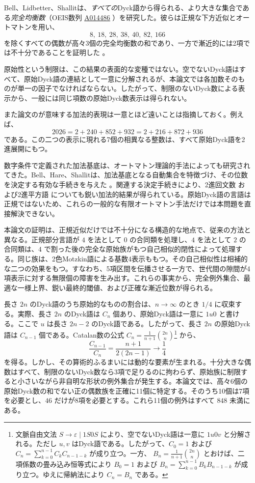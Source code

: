 \documentclass[12pt]{ltjsarticle}
\theoremstyle{plain}
\theoremstyle{definition}
\theoremstyle{plain}
\newcommand{\seqnum}[1]{\href{https://oeis.org/#1}{\textrm{\underline{#1}}}}
\begin{document}
Bell、Lidbetter、Shallitは、\emph{すべての}Dyck語から得られる、より大きな集合である\emph{完全均衡数}（OEIS数列 \seqnum{A014486} \cite{OEIS-A014486}）を研究した。彼らは正規な下方近似とオートマトンを用い、
\[
        8,\ 18,\ 28,\ 38,\ 40,\ 82,\ 166
\]
を除くすべての偶数が高々3個の完全均衡数の和であり、一方で漸近的には2項では不十分であることを証明した \cite[Thm.\ 14]{BLS}。

原始性という制限は、この結果の表面的な変種ではない。空でないDyck語はすべて、原始Dyck語の連結として一意に分解されるが、本論文では各加数そのものが単一の因子でなければならない。したがって、制限のないDyck数による表示から、一般には同じ項数の原始Dyck数表示は得られない。

また論文のが意味する加法的表現は一意とほど遠いことは指摘しておく。例えば、
\[
 2026=2+240+852+932=2+216+872+936
\]
である。この二つの表示に現れる7個の相異なる整数は、すべて原始Dyck語を2進展開にもつ。

数字条件で定義された加法基底は、オートマトン理論的手法によっても研究されてきた。Bell、Hare、Shallitは、加法基底となる自動集合を特徴づけ、その位数を決定する有効な手続きを与えた \cite{BHS}。関連する決定手続きにより、2進回文数 \cite{RSS} および2進平方語 \cite{MNRS} についても鋭い加法的結果が得られている。原始Dyck語の言語は正規ではないため、これらの一般的な有限オートマトン手法だけでは本問題を直接解決できない。

本論文の証明は、正規近似だけでは不十分になる構造的な地点で、従来の方法と異なる。正規部分言語が $4$ を法として $0$ の合同類を処理し、$4$ を法として $2$ の合同類は、$4$ で割った後の完全な原始族がもつ自己相似的閉性によって処理する。同じ族は、2色Motzkin語による基数4表示ももつ。その自己相似性は相補的な二つの効果をもつ。すなわち、5項区間を伝播させる一方で、世代間の隙間が4項表示に対する無限個の障害を生み出す。これらの事実から、完全例外集合、最適な一様上界、鋭い最終的閾値、および正確な漸近位数が得られる。

長さ $2n$ のDyck語のうち原始的なものの割合は、$n\to\infty$ のとき $1/4$ に収束する。実際、長さ $2n$ のDyck語は $C_n$ 個あり、原始Dyck語は一意に $1u0$ と書ける。ここで $u$ は長さ $2n-2$ のDyck語である。したがって、長さ $2n$ の原始Dyck語は $C_{n-1}$ 個である。Catalan数の公式
$C_n=\frac1{n+1}\binom{2n}{n}$\footnote{文脈自由文法
$S\to\varepsilon\mid 1S0S$ により、空でないDyck語は一意に $1u0v$ と分解される。ただし $u,v$ はDyck語である。したがって、$C_0=1$ および
$C_n=\sum_{k=0}^{n-1}C_kC_{n-1-k}$ が成り立つ。一方、
$B_n=\frac{1}{n+1}\binom{2n}{n}$ とおけば、二項係数の畳み込み恒等式により
$B_0=1$ および $B_n=\sum_{k=0}^{n-1}B_kB_{n-1-k}$ が成り立つ。ゆえに帰納法により $C_n=B_n$ である。}
から、
\[
 \frac{C_{n-1}}{C_n}=\frac{n+1}{2(2n-1)}\longrightarrow\frac14
\]
を得る。しかし、その算術的ふるまいには動的な要素が生まれる。十分大きな偶数はすべて、制限のないDyck数なら3項で足りるのに拘わらず、原始族に制限すると小さいながら非自明な形状の例外集合が発生する。本論文では、高々6個の原始Dyck数の和でない正の偶数族を正確に11個に特定する。そのうち10個は7項を必要とし、$46$ だけが8項を必要とする。これら11個の例外はすべて $848$ 未満にある。
\end{document}
